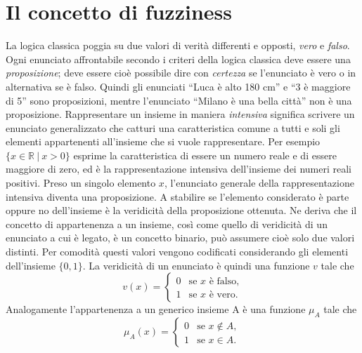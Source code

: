 \documentclass [11pt,a4paper,twoside,openright] {book}
\begin{document}
\section{Il concetto di fuzziness}
La logica classica poggia su due valori di verità differenti e opposti, \textit{vero} e \textit{falso}. Ogni enunciato affrontabile secondo i criteri della logica classica deve essere una \textit{proposizione}; deve essere cioè possibile dire con \textit{certezza} se l'enunciato è vero o in alternativa se è falso. Quindi gli enunciati ``Luca è alto 180 cm'' e ``3 è maggiore di 5'' sono proposizioni, mentre l'enunciato ``Milano è una bella città'' non è una proposizione. Rappresentare un insieme in maniera \textit{intensiva} significa scrivere un enunciato generalizzato che catturi una caratteristica comune a tutti e soli gli elementi appartenenti all'insieme che si vuole rappresentare. Per esempio $\lbrace x \in \mathbb{R} \: | \: x>0 \rbrace$ esprime la caratteristica di essere un numero reale e di essere maggiore di zero, ed è la rappresentazione intensiva dell'insieme dei numeri reali positivi. Preso un singolo elemento $x$, l'enunciato generale della rappresentazione intensiva diventa una proposizione. A stabilire se l'elemento considerato è parte oppure no dell'insieme è la veridicità della proposizione ottenuta. Ne deriva che il concetto di appartenenza a un insieme, così come quello di veridicità di un enunciato a cui è legato, è un concetto binario, può assumere cioè solo due valori distinti. Per comodità questi valori vengono codificati considerando gli elementi dell'insieme $\lbrace 0, 1 \rbrace$. La veridicità di un enunciato è quindi una funzione $v$ tale che
\begin{equation}
v(x)=
\begin{cases}
0 & \text{se } x \text{ è falso,} \\
1 & \text{se } x \text{ è vero.}
\end{cases}
\end{equation}
Analogamente l'appartenenza a un generico insieme A è una funzione $\mu_{A}$ tale che
\begin{equation}
\mu_{A}(x)=
\begin{cases}
0 & \text{se } x \notin A ,\\
1 & \text{se } x \in A.
\end{cases}
\end{equation}
\end{document}

